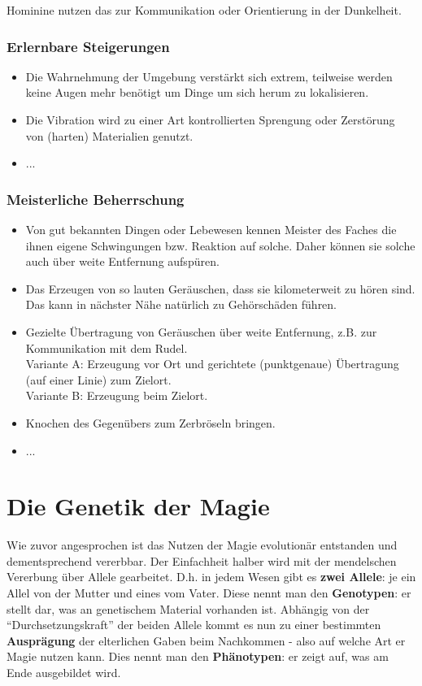 Hominine nutzen das zur Kommunikation oder Orientierung in der Dunkelheit. 

\subsubsection{Erlernbare Steigerungen}
\begin{itemize}
	\item Die Wahrnehmung der Umgebung verstärkt sich extrem, teilweise werden keine Augen mehr benötigt um Dinge um sich herum zu lokalisieren. 
	\item Die Vibration wird zu einer Art kontrollierten Sprengung oder Zerstörung von (harten) Materialien genutzt.
	\item ...
\end{itemize}

\subsubsection{Meisterliche Beherrschung} 
\begin{itemize}
	\item Von gut bekannten Dingen oder Lebewesen kennen Meister des Faches die ihnen eigene Schwingungen bzw. Reaktion auf solche. Daher können sie solche auch über weite Entfernung aufspüren.
	\item Das Erzeugen von so lauten Geräuschen, dass sie kilometerweit zu hören sind. Das kann in nächster Nähe natürlich zu Gehörschäden führen.
	\item Gezielte Übertragung von Geräuschen über weite Entfernung, z.B. zur Kommunikation mit dem Rudel. \\ 
	Variante A: Erzeugung vor Ort und gerichtete (punktgenaue) Übertragung (auf einer Linie) zum Zielort. \\
	Variante B: Erzeugung beim Zielort.
	\item Knochen des Gegenübers zum Zerbröseln bringen.
	\item ...
\end{itemize}




\section{Die Genetik der Magie}
Wie zuvor angesprochen ist das Nutzen der Magie evolutionär entstanden und dementsprechend vererbbar.
Der Einfachheit halber wird mit der mendelschen Vererbung über Allele gearbeitet.
D.h. in jedem Wesen gibt es \textbf{zwei Allele}: je ein Allel von der Mutter und eines vom Vater.
Diese nennt man den \textbf{Genotypen}: er stellt dar, was an genetischem Material vorhanden ist.
Abhängig von der "`Durchsetzungskraft"' der beiden Allele kommt es nun zu einer bestimmten \textbf{Ausprägung} der elterlichen Gaben beim Nachkommen - also auf welche Art er Magie nutzen kann.
Dies nennt man den \textbf{Phänotypen}: er zeigt auf, was am Ende ausgebildet wird.

